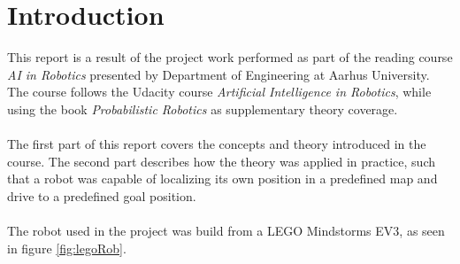 \chapter{Introduction}
\label{chp:intro}

This report is a result of the project work performed as part of the reading course \emph{AI in Robotics} presented by Department of Engineering at Aarhus University.
The course follows the Udacity course \emph{Artificial Intelligence in Robotics}, while using the book \emph{Probabilistic Robotics} \citep{AIbook} as supplementary theory coverage.\\\\
The first part of this report covers the concepts and theory introduced in the course.
The second part describes how the theory was applied in practice, such that a robot was capable of localizing its own position in a predefined map and drive to a predefined goal position.\\\\
The robot used in the project was build from a LEGO Mindstorms EV3, as seen in figure \ref{fig:legoRob}.

